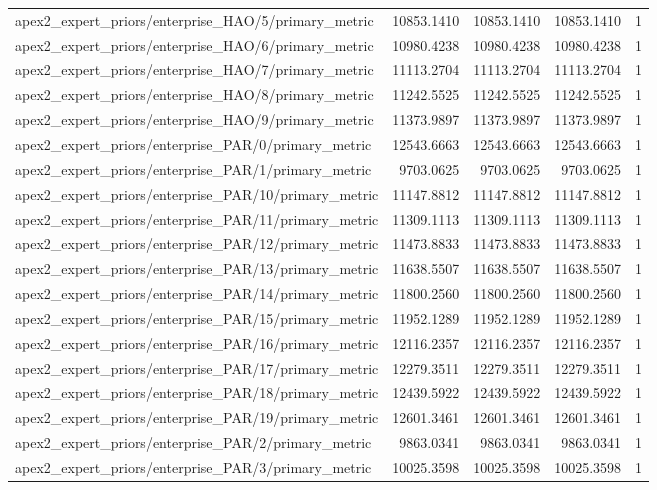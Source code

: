 \begin{table}[h]
\begin{tabular}{lrrrr}
apex2_expert_priors/enterprise_HAO/5/primary_metric & 10853.1410 & 10853.1410 & 10853.1410 & 1 \\
apex2_expert_priors/enterprise_HAO/6/primary_metric & 10980.4238 & 10980.4238 & 10980.4238 & 1 \\
apex2_expert_priors/enterprise_HAO/7/primary_metric & 11113.2704 & 11113.2704 & 11113.2704 & 1 \\
apex2_expert_priors/enterprise_HAO/8/primary_metric & 11242.5525 & 11242.5525 & 11242.5525 & 1 \\
apex2_expert_priors/enterprise_HAO/9/primary_metric & 11373.9897 & 11373.9897 & 11373.9897 & 1 \\
apex2_expert_priors/enterprise_PAR/0/primary_metric & 12543.6663 & 12543.6663 & 12543.6663 & 1 \\
apex2_expert_priors/enterprise_PAR/1/primary_metric & 9703.0625 & 9703.0625 & 9703.0625 & 1 \\
apex2_expert_priors/enterprise_PAR/10/primary_metric & 11147.8812 & 11147.8812 & 11147.8812 & 1 \\
apex2_expert_priors/enterprise_PAR/11/primary_metric & 11309.1113 & 11309.1113 & 11309.1113 & 1 \\
apex2_expert_priors/enterprise_PAR/12/primary_metric & 11473.8833 & 11473.8833 & 11473.8833 & 1 \\
apex2_expert_priors/enterprise_PAR/13/primary_metric & 11638.5507 & 11638.5507 & 11638.5507 & 1 \\
apex2_expert_priors/enterprise_PAR/14/primary_metric & 11800.2560 & 11800.2560 & 11800.2560 & 1 \\
apex2_expert_priors/enterprise_PAR/15/primary_metric & 11952.1289 & 11952.1289 & 11952.1289 & 1 \\
apex2_expert_priors/enterprise_PAR/16/primary_metric & 12116.2357 & 12116.2357 & 12116.2357 & 1 \\
apex2_expert_priors/enterprise_PAR/17/primary_metric & 12279.3511 & 12279.3511 & 12279.3511 & 1 \\
apex2_expert_priors/enterprise_PAR/18/primary_metric & 12439.5922 & 12439.5922 & 12439.5922 & 1 \\
apex2_expert_priors/enterprise_PAR/19/primary_metric & 12601.3461 & 12601.3461 & 12601.3461 & 1 \\
apex2_expert_priors/enterprise_PAR/2/primary_metric & 9863.0341 & 9863.0341 & 9863.0341 & 1 \\
apex2_expert_priors/enterprise_PAR/3/primary_metric & 10025.3598 & 10025.3598 & 10025.3598 & 1 \\

\end{tabular}
\end{table}
